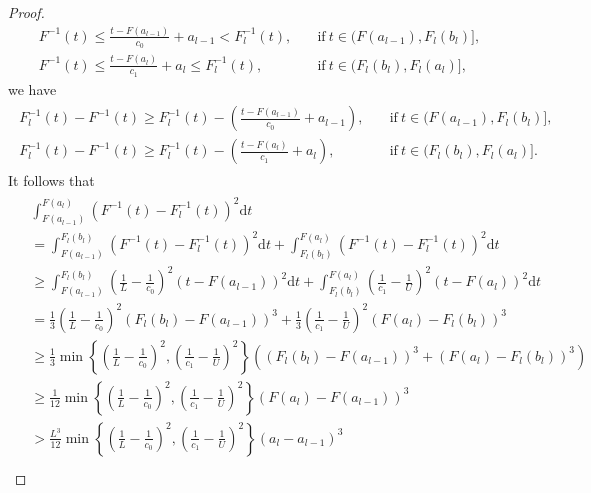 \documentclass[10pt,a4paper]{amsart}
\begin{document}
\begin{proof}
\begin{align*}
        F^{-1} (t) \le \frac{t-F(a_{l-1})}{c_0} + a_{l-1} < F_l^{-1} (t), \quad &\text{if}~t \in (F(a_{l-1}), F_l(b_l)], \\
        F^{-1} (t) \le \frac{t-F(a_{l})}{c_1} + a_{l} \le F_l^{-1} (t), \quad &\text{if}~t \in (F_l(b_l), F_l(a_l)],
    \end{align*}
    we have
    \begin{align}\label{some bounds}
    \begin{split}
    F_l^{-1}(t)-F^{-1}(t)\ge F_l^{-1}(t)-\left(\frac{t-F(a_{l-1})}{c_0} + a_{l-1}\right), \quad &\text{if}~t \in (F(a_{l-1}), F_l(b_l)], \\
    F_l^{-1}(t)-F^{-1}(t)\ge F_l^{-1}(t)-\left(\frac{t-F(a_{l})}{c_1} + a_{l}\right), \quad &\text{if}~t \in (F_l(b_l), F_l(a_l)].
    \end{split}
    \end{align}
    It follows that
    \begin{align}\begin{split} \label{eq:7.33_2}
        & \int_{F(a_{l-1})}^{F(a_l)} \left(F^{-1}(t) - F_l^{-1}(t) \right)^2 \mathrm{d}t \\
        & = \int_{F(a_{l-1})}^{F_l(b_l)} \left(F^{-1}(t) - F_l^{-1}(t) \right)^2 \mathrm{d}t + \int_{F_l(b_{l})}^{F(a_l)} \left(F^{-1}(t) - F_l^{-1}(t) \right)^2 \mathrm{d}t \\
        & \ge \int_{F(a_{l-1})}^{F_l(b_l)} \left( \frac{1}{L} - \frac{1}{c_0} \right)^2 \left( t-F(a_{l-1}) \right)^2 \mathrm{d}t + \int_{F_l(b_{l})}^{F(a_l)} \left( \frac{1}{c_1} - \frac{1}{U} \right)^2 \left( t-F(a_{l}) \right)^2 \mathrm{d}t \\
        & = \frac{1}{3} \left( \frac{1}{L} - \frac{1}{c_0} \right)^2 \left( F_l(b_l)-F(a_{l-1}) \right)^3 + \frac{1}{3} \left( \frac{1}{c_1} - \frac{1}{U} \right)^2 \left( F(a_l)-F_l(b_l) \right)^3 \\
        & \ge \frac{1}{3} \min \left\{ \left( \frac{1}{L} - \frac{1}{c_0} \right)^2, \left( \frac{1}{c_1} - \frac{1}{U} \right)^2 \right\} \left( \left( F_l(b_l)-F(a_{l-1}) \right)^3 + \left( F(a_l)-F_l(b_l) \right)^3 \right) \\
        & \ge \frac{1}{12} \min \left\{ \left( \frac{1}{L} - \frac{1}{c_0} \right)^2, \left( \frac{1}{c_1} - \frac{1}{U} \right)^2 \right\} \left( F(a_l)-F(a_{l-1}) \right)^3 \\
        & > \frac{L^3}{12} \min \left\{ \left( \frac{1}{L} - \frac{1}{c_0} \right)^2, \left( \frac{1}{c_1} - \frac{1}{U} \right)^2 \right\} \left( a_l-a_{l-1} \right)^3 \\

\end{split}
\end{align}
\end{proof}
\end{document}
